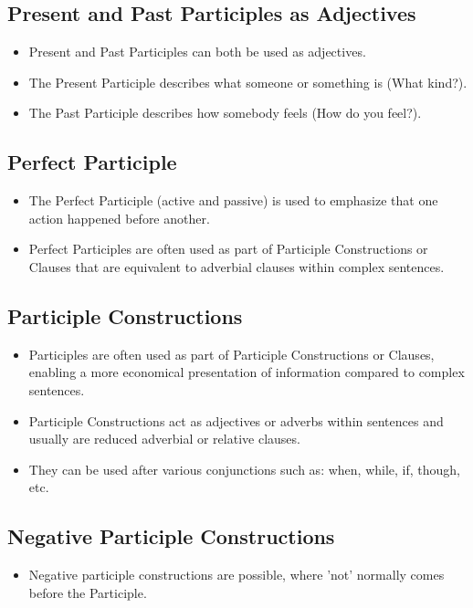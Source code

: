 \subsection*{Present and Past Participles as Adjectives}
\begin{itemize}
      \item Present and Past Participles can both be used as adjectives.
      \item The Present Participle describes what someone or something is (What kind?).
      \item The Past Participle describes how somebody feels (How do you feel?).
\end{itemize}

\subsection*{Perfect Participle}
\begin{itemize}
      \item The Perfect Participle (active and passive) is used to emphasize that one
            action happened before another.
      \item Perfect Participles are often used as part of Participle Constructions or
            Clauses that are equivalent to adverbial clauses within complex sentences.
\end{itemize}

\subsection*{Participle Constructions}
\begin{itemize}
      \item Participles are often used as part of Participle Constructions or Clauses,
            enabling a more economical presentation of information compared to complex
            sentences.
      \item Participle Constructions act as adjectives or adverbs within sentences and
            usually are reduced adverbial or relative clauses.
      \item They can be used after various conjunctions such as: when, while, if,
            though, etc.
\end{itemize}

\subsection*{Negative Participle Constructions}
\begin{itemize}
      \item Negative participle constructions are possible, where 'not' normally comes
            before the Participle.
\end{itemize}

